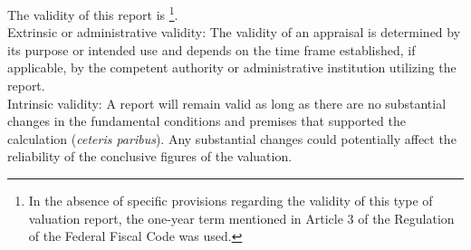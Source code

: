 


The validity of this report is  \textcolor{terciario}{\vigenciaInforme{}} \footnote{In the absence of specific provisions regarding the validity of this type of valuation report, the one-year term mentioned in Article 3 of the Regulation of the Federal Fiscal Code was used.}.\\[5pt]


\textcolor{secundario}{Extrinsic or administrative validity:} The validity of an appraisal is determined by its purpose or intended use and depends on the time frame established, if applicable, by the competent authority or administrative institution utilizing the report.\\[10pt]


\noindent\textcolor{secundario}{Intrinsic validity:} A report will remain valid as long as there are no substantial changes in the fundamental conditions and premises that supported the calculation (\textit{ceteris paribus}). Any substantial changes could potentially affect the reliability of the conclusive figures of the valuation.\\